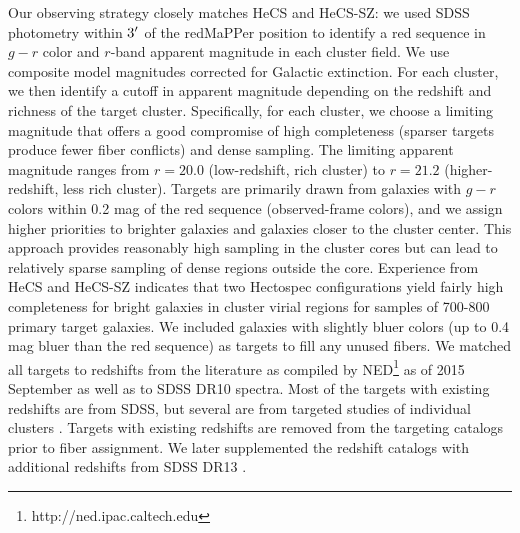 Our observing strategy closely matches HeCS and HeCS-SZ: we used SDSS 
photometry within $3\hbox{$^{\prime}$}$ of the redMaPPer position to identify a red sequence in 
$g-r$ color and $r$-band apparent magnitude in each cluster field.  
We use composite model magnitudes corrected for Galactic 
extinction. %
For each cluster, we then identify
a cutoff in apparent magnitude  depending on 
the redshift and richness of the target cluster.  Specifically, for each 
cluster, we choose a limiting magnitude that 
offers a good compromise of high 
completeness (sparser targets produce fewer fiber conflicts) and dense 
sampling.  The limiting apparent magnitude ranges from $r=20.0$ 
(low-redshift, rich cluster) to $r=21.2$ (higher-redshift, less rich cluster).
Targets are primarily drawn from galaxies with $g-r$ colors within 
0.2 mag of the red sequence (observed-frame colors), and we assign higher priorities to brighter
galaxies and galaxies closer to the cluster center.  This approach provides 
reasonably high sampling in the cluster cores but can lead to relatively sparse 
sampling of dense regions outside the core.  Experience from HeCS and HeCS-SZ 
indicates that two Hectospec configurations yield fairly high completeness 
for bright galaxies in cluster virial regions for
samples of 700-800 primary target galaxies. We included galaxies with slightly 
bluer colors (up to 0.4 mag bluer than the red sequence) as targets to fill any unused fibers. 
We matched all targets to redshifts from the literature as compiled 
by NED\footnote{http://ned.ipac.caltech.edu} as of 2015 September as well as to 
SDSS DR10 spectra. Most 
of the targets with existing redshifts are from SDSS, but several are from targeted 
studies of individual clusters \citep[e.g.,][for A2390 and A0115 respectively]{1996ApJ...471..694A,barrena07b}.
Targets with existing redshifts are removed from the targeting catalogs prior 
to fiber assignment.  We later supplemented the 
redshift catalogs with additional redshifts from SDSS DR13 \citep{dr13arxiv}.


